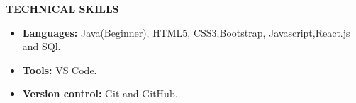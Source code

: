 \documentclass[a4paper,10pt]{article}
\newcommand{\resheading}[1]{{\small \colorbox{mygrey}{\begin{minipage}{0.975\textwidth}{\textbf{#1 \vphantom{p\^{E}}}}\end{minipage}}}}
\begin{document}
\resheading{\textbf{TECHNICAL SKILLS} }
\begin{itemize}
\vspace{-1mm}

\item \textbf{Languages:} Java(Beginner), HTML5, CSS3,Bootstrap, Javascript,React.js and SQl.

\vspace{-1mm}
\item \textbf{Tools: } VS Code.
\vspace{-1mm}

\item \textbf{Version control: } Git and GitHub.
\vspace{-1mm}



\end{itemize}
\end{document}
